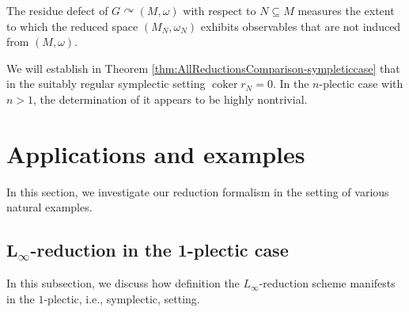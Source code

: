 \documentclass[pdftex]{sigma}
\numberwithin{equation}{section}
\renewcommand{\subset}{\subseteq}
\begin{document}
The residue defect of $G\curvearrowright(M,\omega)$ with respect to $N\subset M$ measures the extent to which the reduced space $(M_N,\omega_N)$ exhibits observables that are not induced from $(M,\omega)$.

We will establish in Theorem \ref{thm:AllReductionsComparison-sympleticcase} that in the suitably regular symplectic setting $\operatorname{coker} r_N=0$. In the $n$-plectic case with $n>1$, the determination of it appears to be highly nontrivial.

\section{Applications and examples}\label{Sec:Examples}

In this section, we investigate our reduction formalism in the setting of various natural examples.

\subsection[L\_infty-reduction in the 1-plectic case]{$\boldsymbol{L_\infty}$-reduction in the 1-plectic case}\label{Ssec:LinftyRed-SympCase}

In this subsection, we discuss how definition the $L_\infty$-reduction scheme manifests in the $1$-plectic, i.e., symplectic, setting.

\end{document}
